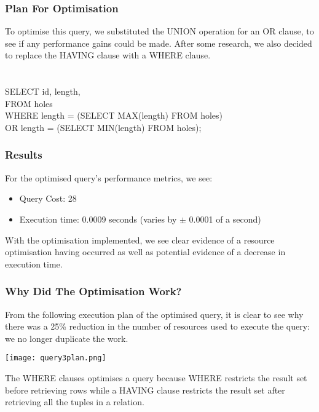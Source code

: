 \documentclass[titlepage]{article}
\begin{document}
\subsubsection{Plan For Optimisation}
\vspace{1em}
To optimise this query, we substituted the UNION operation for an OR clause, to see if any performance gains
could be made. After some research, we also decided to replace the HAVING clause with a WHERE clause. \\ \\ \\
\hspace{15pt}SELECT id, length, \\
\hspace{30pt}FROM holes \\
\hspace{30pt}WHERE length = (SELECT MAX(length) FROM holes) \\
\hspace{30pt}OR length = (SELECT MIN(length) FROM holes); \\
\subsubsection{Results}
For the optimised query's performance metrics, we see:
\begin{itemize}
  \item Query Cost: 28
  \item Execution time: 0.0009 seconds (varies by $\pm$ 0.0001 of a second)
\end{itemize}
\vspace{1em}
With the optimisation implemented, we see clear evidence of a resource optimisation having occurred as well
as potential evidence of a decrease in execution time. \\
\subsubsection{Why Did The Optimisation Work?}
From the following execution plan of the optimised query, it is clear to see why there was a 25\% reduction
in the number of resources used to execute the query: we no longer duplicate the work. \\
\begin{center}
\texttt{[image: query3plan.png]}
\end{center}
\noindent
The WHERE clauses optimises a query because WHERE restricts the result set before retrieving rows
while a HAVING clause restricts the result set after retrieving all the tuples in a relation. \\
\newpage
\end{document}
